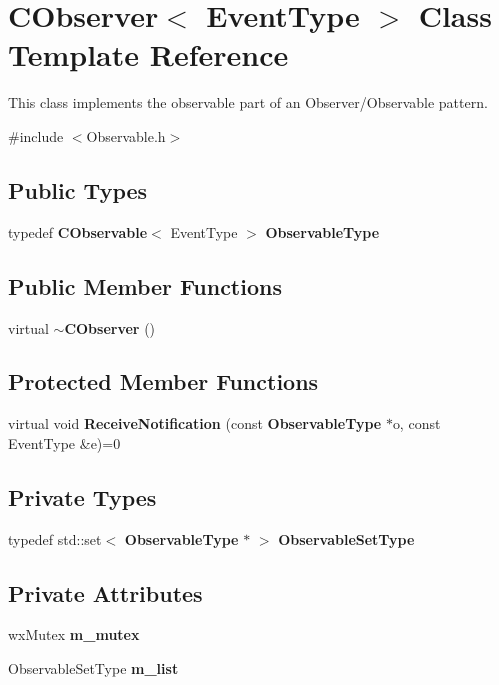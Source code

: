 \section{CObserver$<$ EventType $>$ Class Template Reference}
\label{classCObserver}


This class implements the observable part of an Observer/Observable pattern.  


{\ttfamily \#include $<$Observable.h$>$}\subsection*{Public Types}
\begin{DoxyCompactItemize}
\item 
typedef {\bf CObservable}$<$ EventType $>$ {\bfseries ObservableType}\label{classCObserver_a1ef3c149359bfde1bf4a224a9ad9b537}

\end{DoxyCompactItemize}
\subsection*{Public Member Functions}
\begin{DoxyCompactItemize}
\item 
virtual {\bf $\sim$CObserver} ()
\end{DoxyCompactItemize}
\subsection*{Protected Member Functions}
\begin{DoxyCompactItemize}
\item 
virtual void {\bf ReceiveNotification} (const {\bf ObservableType} $\ast$o, const EventType \&e)=0
\end{DoxyCompactItemize}
\subsection*{Private Types}
\begin{DoxyCompactItemize}
\item 
typedef std::set$<$ {\bf ObservableType} $\ast$ $>$ {\bfseries ObservableSetType}\label{classCObserver_a11936d342076048a6caa8bd7dc7febde}

\end{DoxyCompactItemize}
\subsection*{Private Attributes}
\begin{DoxyCompactItemize}
\item 
wxMutex {\bf m\_\-mutex}\label{classCObserver_a8dba5ea3df2e0ac1ab5b78020009509e}

\item 
ObservableSetType {\bf m\_\-list}\label{classCObserver_a5137196a05a031272f9e13341051b6a6}

\end{DoxyCompactItemize}
